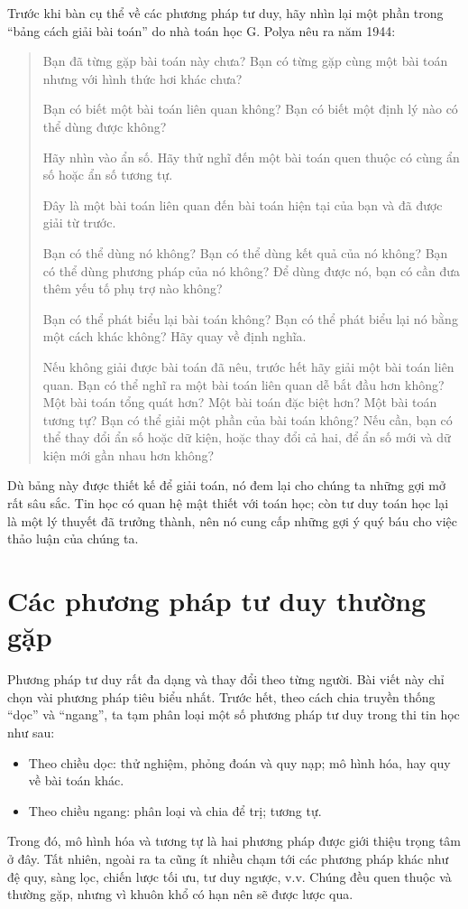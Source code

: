 \documentclass[11pt]{article}
\begin{document}
Trước khi bàn cụ thể về các phương pháp tư duy, hãy nhìn lại một phần trong
``bảng cách giải bài toán'' do nhà toán học G. Polya nêu ra năm 1944:
\begin{quote}
Bạn đã từng gặp bài toán này chưa? Bạn có từng gặp cùng một bài toán nhưng với
hình thức hơi khác chưa?

Bạn có biết một bài toán liên quan không? Bạn có biết một định lý nào có thể
dùng được không?

Hãy nhìn vào ẩn số. Hãy thử nghĩ đến một bài toán quen thuộc có cùng ẩn số
hoặc ẩn số tương tự.

Đây là một bài toán liên quan đến bài toán hiện tại của bạn và đã được giải từ
trước.

Bạn có thể dùng nó không? Bạn có thể dùng kết quả của nó không? Bạn có thể
dùng phương pháp của nó không? Để dùng được nó, bạn có cần đưa thêm yếu tố phụ
trợ nào không?

Bạn có thể phát biểu lại bài toán không? Bạn có thể phát biểu lại nó bằng một
cách khác không? Hãy quay về định nghĩa.

Nếu không giải được bài toán đã nêu, trước hết hãy giải một bài toán liên
quan. Bạn có thể nghĩ ra một bài toán liên quan dễ bắt đầu hơn không? Một bài
toán tổng quát hơn? Một bài toán đặc biệt hơn? Một bài toán tương tự? Bạn có
thể giải một phần của bài toán không? Nếu cần, bạn có thể thay đổi ẩn số hoặc
dữ kiện, hoặc thay đổi cả hai, để ẩn số mới và dữ kiện mới gần nhau hơn không?
\end{quote}
Dù bảng này được thiết kế để giải toán, nó đem lại cho chúng ta những gợi mở
rất sâu sắc. Tin học có quan hệ mật thiết với toán học; còn tư duy toán học
lại là một lý thuyết đã trưởng thành, nên nó cung cấp những gợi ý quý báu cho
việc thảo luận của chúng ta.

\section{Các phương pháp tư duy thường gặp}

Phương pháp tư duy rất đa dạng và thay đổi theo từng người. Bài viết này chỉ
chọn vài phương pháp tiêu biểu nhất. Trước hết, theo cách chia truyền thống
``dọc'' và ``ngang'', ta tạm phân loại một số phương pháp tư duy trong thi tin
học như sau:
\begin{itemize}
  \item Theo chiều dọc: thử nghiệm, phỏng đoán và quy nạp; mô hình hóa, hay
  quy về bài toán khác.
  \item Theo chiều ngang: phân loại và chia để trị; tương tự.
\end{itemize}
Trong đó, mô hình hóa và tương tự là hai phương pháp được giới thiệu trọng tâm
ở đây. Tất nhiên, ngoài ra ta cũng ít nhiều chạm tới các phương pháp khác như
đệ quy, sàng lọc, chiến lược tối ưu, tư duy ngược, v.v. Chúng đều quen thuộc
và thường gặp, nhưng vì khuôn khổ có hạn nên sẽ được lược qua.
\end{document}
